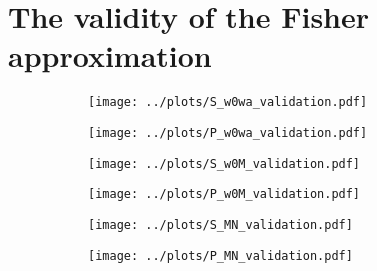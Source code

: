 \documentclass[../main.tex]{subfiles}
\begin{document}
\section{The validity of the Fisher approximation}
\begin{figure}
    \centering
    \caption{Comparison of the one and two-dimensional marginalized contours obtained by MontePython in MCMC mode ({\tt MP:MCMC}) with the contours of \cosmicfish:\camb and \montefisher. The contours depict the 68\% and 95\% confidence intervals for the $w_0w_a$CDM model respectively. We plot only the cosmological parameters for the different probes. On the left, we show the spectroscopic probe and on the right, we show the photometric probe.}
    \begin{subfigure}[b]{0.49\textwidth}
        \centering
        \texttt{[image: ../plots/S\_w0wa\_validation.pdf]}
    \end{subfigure}
    \hfill
    \begin{subfigure}[b]{0.49\textwidth}
        \centering
        \texttt{[image: ../plots/P\_w0wa\_validation.pdf]}
    \end{subfigure}
       \label{fig:w0wa_triangle} 
\end{figure}
\begin{figure}
    \centering
    \caption{Same as figure \ref{fig:w0wa_triangle} but for the $w_0$CDM+$m_\nu$ model.}
    \begin{subfigure}[b]{0.49\textwidth}
        \centering
        \texttt{[image: ../plots/S\_w0M\_validation.pdf]}
    \end{subfigure}
    \hfill
    \begin{subfigure}[b]{0.49\textwidth}
        \centering
        \texttt{[image: ../plots/P\_w0M\_validation.pdf]}
    \end{subfigure}
       \label{fig:w0M_triangle} 
\end{figure}
\begin{figure}
    \centering
    \caption{Same as figure \ref{fig:w0wa_triangle} but for the $\Lambda$CDM+$m_\nu+\neff$ model.}
    \begin{subfigure}[b]{0.49\textwidth}
        \centering
        \texttt{[image: ../plots/S\_MN\_validation.pdf]}
    \end{subfigure}
    \hfill
    \begin{subfigure}[b]{0.49\textwidth}
        \centering
        \texttt{[image: ../plots/P\_MN\_validation.pdf]}
    \end{subfigure}
       \label{fig:MN_triangle} 
\end{figure}
\end{document}
